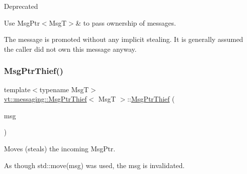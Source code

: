 \begin{DoxyRefDesc}{Deprecated}
\item[\hyperlink{deprecated__deprecated000009}{Deprecated}]Use {\ttfamily Msg\+Ptr$<$\+Msg\+T$>$\&} to pass ownership of messages.\end{DoxyRefDesc}


The message is promoted without any implicit stealing. It is generally assumed the caller did not \textquotesingle{}own\textquotesingle{} this message anyway. \mbox{\label{structvt_1_1messaging_1_1_msg_ptr_thief_a6f24dfa36e04c82511704c05d0904de1}} 
\subsubsection{\texorpdfstring{Msg\+Ptr\+Thief()}{MsgPtrThief()}\hspace{0.1cm}{\footnotesize\ttfamily [2/3]}}
{\footnotesize\ttfamily template$<$typename MsgT$>$ \\
\hyperlink{structvt_1_1messaging_1_1_msg_ptr_thief}{vt\+::messaging\+::\+Msg\+Ptr\+Thief}$<$ MsgT $>$\+::\hyperlink{structvt_1_1messaging_1_1_msg_ptr_thief}{Msg\+Ptr\+Thief} (\begin{DoxyParamCaption}\item[{\hyperlink{structvt_1_1messaging_1_1_msg_shared_ptr}{Msg\+Shared\+Ptr}$<$ MsgT $>$ \&}]{msg }\end{DoxyParamCaption})\hspace{0.3cm}{\ttfamily [inline]}}



Moves (steals) the incoming Msg\+Ptr. 

As though {\ttfamily std\+::move(msg)} was used, the {\ttfamily msg} is invalidated. \mbox{\label{structvt_1_1messaging_1_1_msg_ptr_thief_aed4e66a07cc56e9db883a66270682d02}} 
